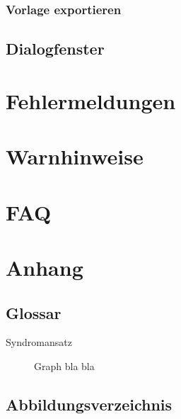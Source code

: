 \documentclass[enabledeprecatedfontcommands,fontsize=11pt,paper=a4,twoside]{scrartcl}
\begin{document}
		\subsubsection{Vorlage exportieren}
	\subsection{Dialogfenster} \label{dialog}
	\newpage
	\section{Fehlermeldungen} \label{fehlermeldungen}
	
	
\section{Warnhinweise} \label{sec:warnhinweise}
	
	
	
	
\section{FAQ}
\newpage
\section{Anhang} \label{sec:anhang}	
	\subsection{Glossar}
	
	\begin{description}
		\item[Syndromansatz] Graph bla bla
	\end{description}
	
	\subsection{Abbildungsverzeichnis}
	\listoffigures
	

\newpage



\end{document}
